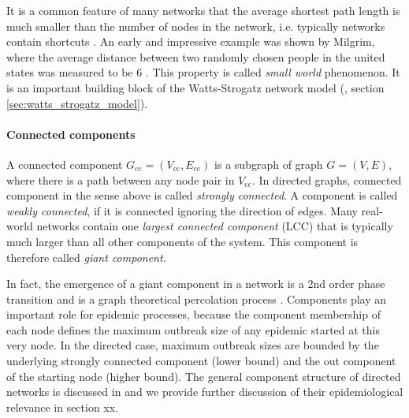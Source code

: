 \documentclass[openright,twoside,headsepline]{scrbook}
\begin{document}
It is a common feature of many networks that the average shortest path length is much smaller than the number of nodes in the network, i.e. typically networks contain shortcuts \citep{RevModPhys.74}.
An early and impressive example was shown by Milgrim, where the average distance between two randomly chosen people in the united states was measured to be 6 \citep{Milgram:1967}. 
This property is called \emph{small world} phenomenon.
It is an important building block of the Watts-Strogatz network model (\citep{Watts:1998}, section \ref{sec:watts_strogatz_model}).



\paragraph{Connected components\color{Cayenne}{.}}
A connected component $G_\mathrm{cc}=(V_\mathrm{cc},E_\mathrm{cc})$ is a subgraph of graph $G=(V,E)$, where there is a path between any node pair in $V_\mathrm{cc}$.
In directed graphs, connected component in the sense above is called \emph{strongly connected}.
A component is called \emph{weakly connected}, if it is connected ignoring the direction of edges.
Many real-world networks contain one \emph{largest connected component} (LCC) that is typically much larger than all other components of the system.
This component is therefore called \emph{giant component}.

In fact, the emergence of a giant component in a network is a 2nd order phase transition and is a graph theoretical percolation process \citep{Newman2003}. 
Components play an important role for epidemic processes, because the component membership of each node defines the maximum outbreak size of any epidemic started at this very node.
In the directed case, maximum outbreak sizes are bounded by the underlying strongly connected component (lower bound) and the out component of the starting node (higher bound).
The general component structure of directed networks is discussed in \citep{Dorogovtsev:2001jd} and we provide further discussion of their epidemiological relevance in section xx.
\end{document}

